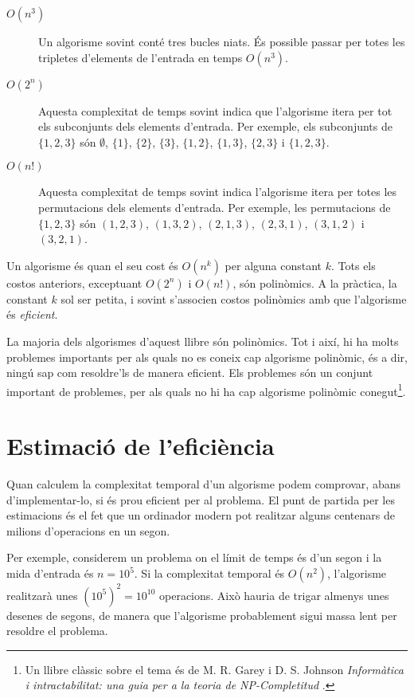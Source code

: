 \begin{description}
\item[$O(n^3)$]
Un algorisme  sovint conté
tres bucles niats.
És possible passar per totes les tripletes
d'elements de l'entrada en temps $O(n^3)$.

\item[$O(2^n)$]
Aquesta complexitat de temps sovint indica
que l'algorisme itera per tot
els subconjunts dels elements d'entrada.
Per exemple, els subconjunts de $\{1,2,3\}$ són
$\emptyset$, $\{1\}$, $\{2\}$, $\{3\}$, $\{1,2\}$,
$\{1,3\}$, $\{2,3\}$ i $\{1,2,3\}$.

\item[$O(n!)$]
Aquesta complexitat de temps sovint indica
l'algorisme itera per totes les
permutacions dels elements d'entrada.
Per exemple, les permutacions de $\{1,2,3\}$ són
$(1,2,3)$, $(1,3,2)$, $(2,1,3)$, $(2,3,1)$,
$(3,1,2)$ i $(3,2,1)$.

\end{description}

Un algorisme és 
quan el seu cost és $O(n^k)$ per alguna constant $k$.
Tots els costos anteriors, exceptuant
$O(2^n)$ i $O(n!)$, són polinòmics.
A la pràctica, la constant $k$ sol ser petita,
i sovint s'associen costos polinòmics
amb que l'algorisme és \emph{eficient}.


La majoria dels algorismes d'aquest llibre són polinòmics.
Tot i així, hi ha molts problemes importants per als quals
no es coneix cap algorisme polinòmic, és a dir,
ningú sap com resoldre'ls de manera eficient.
Els problemes  són un conjunt important
de problemes, per als quals no hi ha cap algorisme polinòmic
conegut\footnote{Un llibre clàssic sobre el tema és
de M. R. Garey i D. S. Johnson
\emph{Informàtica i intractabilitat: una guia per a la teoria
de NP-Completitud} \cite{gar79}.}.

\section{Estimació de l'eficiència}

Quan calculem la complexitat temporal
d'un algorisme podem comprovar,
abans d'implementar-lo, si és
prou eficient per al problema.
El punt de partida per les estimacions és el fet que
un ordinador modern pot realitzar alguns centenars de
milions d'operacions en un segon.

Per exemple, considerem un problema on el límit de temps
és d'un segon i la mida d'entrada és $n=10^5$.
Si la complexitat temporal és $O(n^2)$,
l'algorisme realitzarà unes $(10^5)^2=10^{10}$ operacions.
Això hauria de trigar almenys unes desenes de segons,
de manera que l'algorisme probablement sigui massa lent
per resoldre el problema.

